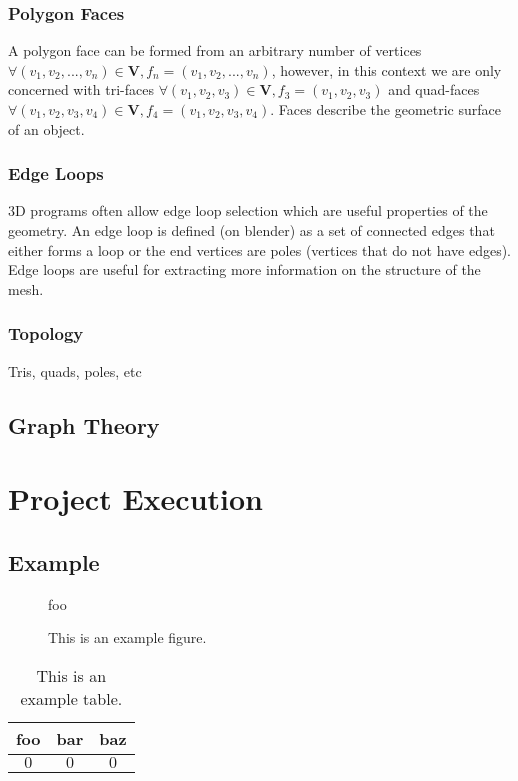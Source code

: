 \documentclass[ %
                    author={Dillon Keith Diep [INCOMPLETE DRAFT, NOT FOR SUBMISSION]},
                supervisor={Dr. Carl Henrik Ek},
                    degree={MEng},
                     title={ART-CG:},
                  subtitle={Assisted Real-Time Content Generation of 3D Hair Geometry},
                      type={Research},
                      year={2014} ]{dissertation}
\begin{document}
\subsection{Polygon Faces}
A polygon face can be formed from an arbitrary number of vertices $\forall (v_1, v_2,...,v_n) \in \mathbf{V}, f_n = (v_1, v_2,..., v_n)$, however, in this context we are only concerned with tri-faces $\forall (v_1, v_2, v_3) \in \mathbf{V}, f_3 = (v_1, v_2, v_3)$ and quad-faces $\forall (v_1, v_2, v_3, v_4) \in \mathbf{V}, f_4 = (v_1, v_2, v_3, v_4)$. Faces describe the geometric surface of an object. 

\subsection{Edge Loops}
{\color{red}
3D programs often allow edge loop selection which are useful properties of the geometry. An edge loop is defined (on blender) as a set of connected edges that either forms a loop or the end vertices are poles (vertices that do not have edges). Edge loops are useful for extracting more information on the structure of the mesh.
\cite{edgeloops}
}

\subsection{Topology}
Tris, quads, poles, etc

\section{Graph Theory}




\chapter{Project Execution}
\label{chap:execution}

\section{Example}
\begin{figure}[!h]
	\centering
	foo
	\caption{This is an example figure.}
	\label{fig}
\end{figure}

\begin{table}[!h]
	\centering
	\begin{tabular}{|cc|c|}
		\hline
		foo      & bar      & baz      \\
		\hline
		$0     $ & $0     $ & $0     $ \\
		\hline
	\end{tabular}
	\caption{This is an example table.}
	\label{tab}
\end{table}
\end{document}
